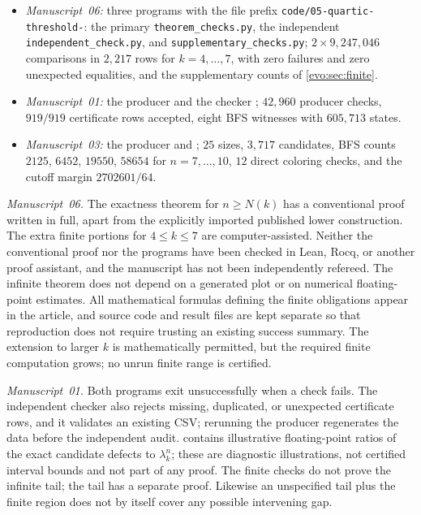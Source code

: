 \documentclass[11pt,a4paper]{article}
\numberwithin{equation}{section}
\theoremstyle{definition}
\theoremstyle{remark}
\begin{document}
\begin{itemize}
\item \emph{Manuscript~06:} three programs with the file prefix
\texttt{code/05-quartic-threshold-}: the primary
\texttt{theorem\_\allowbreak checks.py}, the independent
\texttt{independent\_\allowbreak check.py}, and
\texttt{supplementary\_\allowbreak checks.py}; $2\times9{,}247{,}046$
comparisons in $2{,}217$ rows for $k=4,\ldots,7$, with zero failures and zero
unexpected equalities, and the supplementary counts of \cref{evo:sec:finite}.
\item \emph{Manuscript~01:} the producer 
and the checker ; $42{,}960$
producer checks, $919/919$ certificate rows accepted, eight BFS witnesses with
$605{,}713$ states.
\item \emph{Manuscript~03:} the producer
 and
; $25$ sizes, $3{,}717$
candidates, BFS counts $2125$, $6452$, $19550$, $58654$ for $n=7,\ldots,10$,
$12$ direct coloring checks, and the cutoff margin $2702601/64$.
\end{itemize}

\emph{Manuscript~06.} The exactness theorem for $n\ge N(k)$ has a conventional
proof written in full, apart from the explicitly imported published lower
construction. The extra finite portions for $4\le k\le7$ are
computer-assisted. Neither the conventional proof nor the programs have been
checked in Lean, Rocq, or another proof assistant, and the manuscript has not
been independently refereed. The infinite theorem does not depend on a
generated plot or on numerical floating-point estimates. All mathematical
formulas defining the finite obligations appear in the article, and source
code and result files are kept separate so that reproduction does not require
trusting an existing success summary. The extension to larger $k$ is
mathematically permitted, but the required finite computation grows; no unrun
finite range is certified.

\emph{Manuscript~01.} Both programs exit unsuccessfully when a check fails.
The independent checker also rejects missing, duplicated, or unexpected
certificate rows, and it validates an existing CSV; rerunning the producer
regenerates the data before the independent audit.
 contains illustrative
floating-point ratios of the exact candidate defects to $\lambda_k^n$; these
are diagnostic illustrations, not certified interval bounds and not part of
any proof. The finite checks do not prove the infinite tail; the tail has a
separate proof. Likewise an unspecified tail plus the finite region does not
by itself cover any possible intervening gap.
\end{document}
